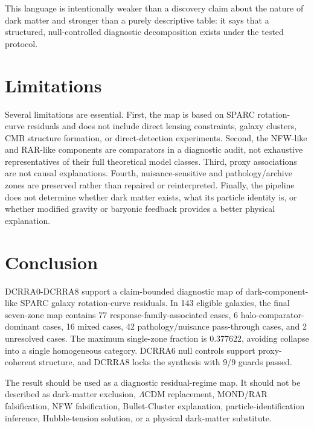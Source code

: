 \documentclass[11pt,a4paper]{article}
\begin{document}
This language is intentionally weaker than a discovery claim about the nature of dark matter and stronger than a purely descriptive table: it says that a structured, null-controlled diagnostic decomposition exists under the tested protocol.

\section{Limitations}
Several limitations are essential. First, the map is based on SPARC rotation-curve residuals and does not include direct lensing constraints, galaxy clusters, CMB structure formation, or direct-detection experiments. Second, the NFW-like and RAR-like components are comparators in a diagnostic audit, not exhaustive representatives of their full theoretical model classes. Third, proxy associations are not causal explanations. Fourth, nuisance-sensitive and pathology/archive zones are preserved rather than repaired or reinterpreted. Finally, the pipeline does not determine whether dark matter exists, what its particle identity is, or whether modified gravity or baryonic feedback provides a better physical explanation.

\section{Conclusion}
DCRRA0-DCRRA8 support a claim-bounded diagnostic map of dark-component-like SPARC galaxy rotation-curve residuals. In 143 eligible galaxies, the final seven-zone map contains 77 response-family-associated cases, 6 halo-comparator-dominant cases, 16 mixed cases, 42 pathology/nuisance pass-through cases, and 2 unresolved cases. The maximum single-zone fraction is 0.377622, avoiding collapse into a single homogeneous category. DCRRA6 null controls support proxy-coherent structure, and DCRRA8 locks the synthesis with 9/9 guards passed.

The result should be used as a diagnostic residual-regime map. It should not be described as dark-matter exclusion, $\Lambda$CDM replacement, MOND/RAR falsification, NFW falsification, Bullet-Cluster explanation, particle-identification inference, Hubble-tension solution, or a physical dark-matter substitute.
\end{document}

